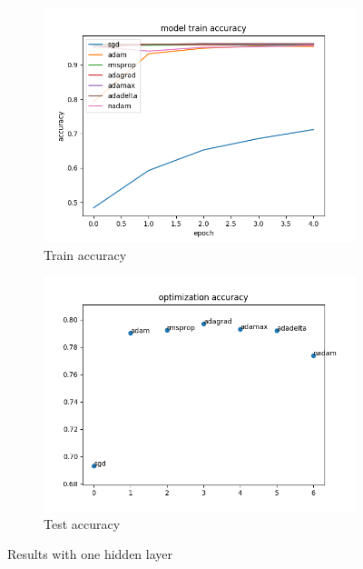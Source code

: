 \documentclass{article}
\begin{document}
\begin{figure}[H]
    \centering
    \begin{subfigure}[b]{0.7\textwidth}
        \includegraphics[width=\textwidth]{1layertotaltrainacc.png}
        \caption{Train accuracy}
        \label{fig:onelayertrainacc}
    \end{subfigure}
    \begin{subfigure}[b]{0.7\textwidth}
        \includegraphics[width=\textwidth]{1layer_total_opt_acc.png}
        \caption{Test accuracy}
        \label{fig:onelayertestacc}
    \end{subfigure}
    \caption{Results with one hidden layer}\label{fig:rol}
\end{figure}
\end{document}
